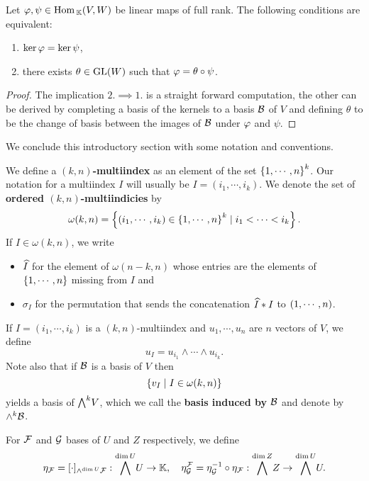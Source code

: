 \begin{lemma}\label{kerAkerBVSActionOfGLk}
Let $\varphi,\psi\in \mathrm{Hom}\,_{\mathbb{K}}(V,W)$ be linear maps of full rank. The following conditions are equivalent:
\begin{enumerate}
    \item $\ker\varphi=\ker\psi$,
    \item there exists $\theta\in \mathrm{GL}(W)$ such that $\varphi=\theta\circ \psi$. 
\end{enumerate}
\end{lemma}
\begin{proof}
The implication $2.\implies 1.$ is a straight forward computation, the other can be derived by completing a basis of the kernels to a basis $\mathcal{B}$ of $V$ and defining $\theta$ to be the change of basis between the images of $\mathcal{B}$ under $\varphi$ and $\psi$.
\end{proof}

\noindent We conclude this introductory section with some notation and conventions.
\begin{definition}[Multiindicies]
We define a \textbf{$(k,n)$-multiindex} as an element of the set $\left\{{1,\cdots, n}\right\}^k$. Our notation for a multiindex $I$ will usually be $I=(i_1,\cdots, i_k)$. 
We denote the set of \textbf{ordered $(k,n)$-multiindicies} by
\[\omega(k,n)=\left\{{(i_1,\cdots, i_k)\in \left\{{1,\cdots, n}\right\}^k\mid i_1<\cdots<i_k}\right\}.\]
If $I\in \omega(k,n)$, we write
\begin{itemize}
\item $\widehat{I}$ for the element of $\omega(n-k,n)$ whose entries are the elements of $\left\{{1,\cdots, n}\right\}$ missing from $I$ and 
\item $\sigma_I$ for the permutation that sends the concatenation $\widehat{I}\ast I$ to $\left({1,\cdots, n}\right)$.
\end{itemize}
\end{definition}

\begin{remark}
If $I=(i_1,\cdots, i_k)$ is a $(k,n)$-multiindex and $u_1,\cdots, u_n$ are $n$ vectors of $V$, we define
\[u_I=u_{i_1}\wedge\cdots\wedge u_{i_k}.\]
Note also that if $\mathcal{B}$ is a basis of $V$ then
\[\left\{{v_I\mid I\in \omega(k,n)}\right\}\]
yields a basis of $\bw V$, which we call the \textbf{basis induced by $\mathcal{B}$} and denote by $\wedge^k\mathcal{B}$.
\end{remark}

\begin{notation}
For $\mathcal{F}$ and $\mathcal{G}$ bases of $U$ and $Z$ respectively, we define
\[\eta_\Fc=[\cdot]_{\wedge^{\dim U}\Fc}:\bw[\dim U]U\to \K,\quad \eta^\Fc_\Gc=\eta_\Gc\ii\circ \eta_\Fc:\bw[\dim Z]Z\to\bw[\dim U]U.\]
\end{notation}



